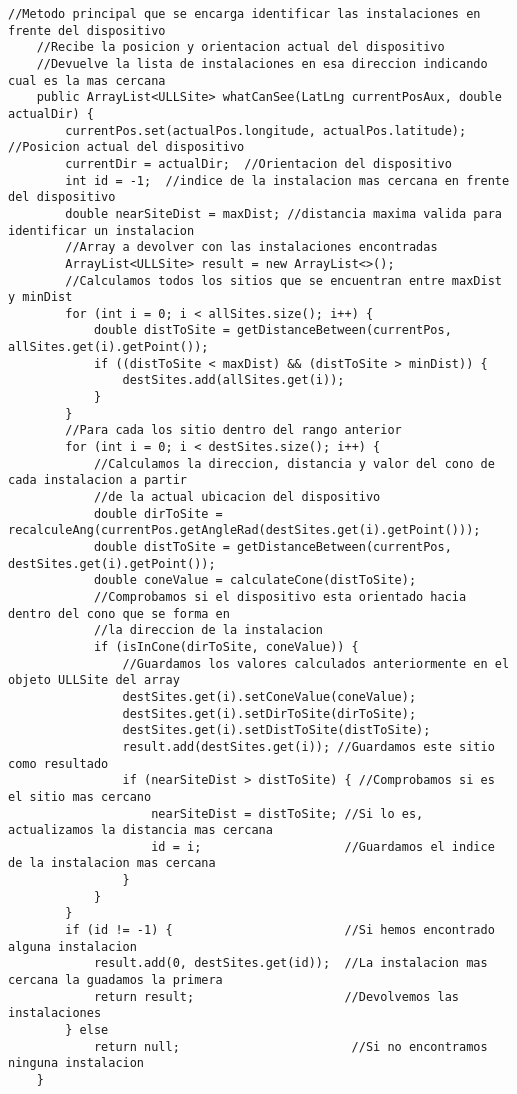 \begin{lstlisting}[caption={Metodo principal que realiza el cálculo que permite reconocer las instalaciones en frente al dispositivo móvil.}, label={lst:whatCanSee}]
    //Metodo principal que se encarga identificar las instalaciones en frente del dispositivo
    //Recibe la posicion y orientacion actual del dispositivo
    //Devuelve la lista de instalaciones en esa direccion indicando cual es la mas cercana 
    public ArrayList<ULLSite> whatCanSee(LatLng currentPosAux, double actualDir) {
        currentPos.set(actualPos.longitude, actualPos.latitude); //Posicion actual del dispositivo
        currentDir = actualDir;  //Orientacion del dispositivo
        int id = -1;  //indice de la instalacion mas cercana en frente del dispositivo
        double nearSiteDist = maxDist; //distancia maxima valida para identificar un instalacion
        //Array a devolver con las instalaciones encontradas
        ArrayList<ULLSite> result = new ArrayList<>(); 
        //Calculamos todos los sitios que se encuentran entre maxDist y minDist
        for (int i = 0; i < allSites.size(); i++) {
            double distToSite = getDistanceBetween(currentPos, allSites.get(i).getPoint());
            if ((distToSite < maxDist) && (distToSite > minDist)) {
                destSites.add(allSites.get(i));
            }
        }
        //Para cada los sitio dentro del rango anterior 
        for (int i = 0; i < destSites.size(); i++) {  
            //Calculamos la direccion, distancia y valor del cono de cada instalacion a partir 
            //de la actual ubicacion del dispositivo
            double dirToSite = recalculeAng(currentPos.getAngleRad(destSites.get(i).getPoint()));
            double distToSite = getDistanceBetween(currentPos, destSites.get(i).getPoint());
            double coneValue = calculateCone(distToSite);
            //Comprobamos si el dispositivo esta orientado hacia dentro del cono que se forma en  
            //la direccion de la instalacion
            if (isInCone(dirToSite, coneValue)) { 
                //Guardamos los valores calculados anteriormente en el objeto ULLSite del array
                destSites.get(i).setConeValue(coneValue); 
                destSites.get(i).setDirToSite(dirToSite); 
                destSites.get(i).setDistToSite(distToSite); 
                result.add(destSites.get(i)); //Guardamos este sitio como resultado
                if (nearSiteDist > distToSite) { //Comprobamos si es el sitio mas cercano
                    nearSiteDist = distToSite; //Si lo es, actualizamos la distancia mas cercana
                    id = i;                    //Guardamos el indice de la instalacion mas cercana
                }
            }
        }
        if (id != -1) {                        //Si hemos encontrado alguna instalacion
            result.add(0, destSites.get(id));  //La instalacion mas cercana la guadamos la primera
            return result;                     //Devolvemos las instalaciones                   
        } else
            return null;                        //Si no encontramos ninguna instalacion
    }
\end{lstlisting}

